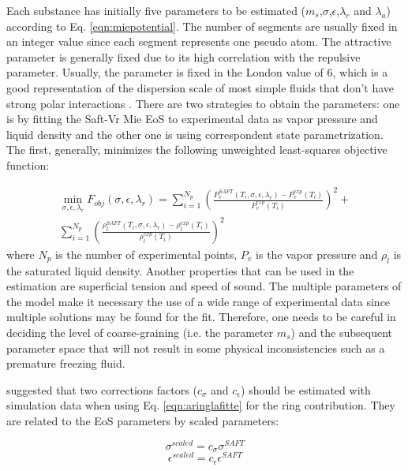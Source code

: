 	Each substance has initially five parameters to be estimated ($m_s$,$\sigma$,$\epsilon$,$\lambda_{r}$ and $\lambda_{a}$) according to Eq. \eqref{eqn:miepotential}. The number of segments are usually fixed in an integer value since each segment represents one pseudo atom. The attractive parameter is generally  fixed due to its  high correlation with the repulsive parameter. Usually, the parameter is fixed in the London value of 6, which is a good representation of the dispersion scale of most simple fluids that don't have strong polar interactions \cite{ramrattan2015,herdes2015}. There are two strategies to obtain the parameters: one is by fitting the Saft-Vr Mie EoS to experimental data as vapor pressure and liquid density and the other one is using correspondent state parametrization. The first, generally, minimizes the following unweighted least-squares objective function:
	
	\begin{equation}
	\begin{aligned}
	\min\limits_{\sigma,\epsilon,\lambda_{r}} F_{obj}(\sigma,\epsilon,\lambda_{r})= \sum_{i=1}^{N_{p}} \left(\frac{P_{v}^{SAFT}(T_{i},\sigma,\epsilon,\lambda_{r})-P_{v}^{exp}(T_{i})}{P_{v}^{exp}(T_{i})} \right)^2 +\\
	\sum_{i=1}^{N_{p}} \left(\frac{\rho_{l}^{SAFT}(T_{i},\sigma,\epsilon,\lambda_{r})-\rho_{l}^{exp}(T_{i})}{\rho_{l}^{exp}(T_{i})} \right)^2
	\end{aligned}
	\label{eqn:fobj}
	\end{equation}
	where $N_{p}$ is the number of experimental points, $P_{v}$ is the vapor pressure and $\rho_{l}$ is the saturated liquid density. Another properties that can be used in the estimation are superficial tension and speed of sound. The multiple parameters of the model make it necessary the use of a wide range of experimental data since multiple solutions may be found for the fit. Therefore, one needs to be careful in deciding the level of coarse-graining (i.e. the parameter $m_{s}$) and the subsequent parameter space that will not result in some physical inconsistencies such as a premature freezing fluid.
	
	 suggested that two corrections factors ($c_{\sigma}$ and $c_{\epsilon}$) should be estimated with simulation data when using Eq. \eqref{eqn:aringlafitte} for the ring contribution. They are related to the EoS parameters by scaled parameters:
	
	\begin{equation}
	\sigma^{scaled} = c_{\sigma}\sigma^{SAFT}
	\label{eqn:csigma}
	\end{equation}
	\begin{equation}
	\epsilon^{scaled} = c_{\epsilon}\epsilon^{SAFT}
	\label{eqn:ceps}
	\end{equation}
	
